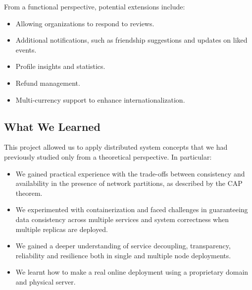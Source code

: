 From a functional perspective, potential extensions include:

\begin{itemize}
  \item Allowing organizations to respond to reviews.
  \item Additional notifications, such as friendship suggestions and updates on liked events.
  \item Profile insights and statistics.
  \item Refund management.
  \item Multi-currency support to enhance internationalization.
\end{itemize}

\subsection{What We Learned}

This project allowed us to apply distributed system concepts that we had previously studied only from a theoretical perspective. In particular:

\begin{itemize}
  \item We gained practical experience with the trade-offs between consistency and availability in the presence of network partitions, as described by the CAP theorem.

  \item We experimented with containerization and faced challenges in guaranteeing data consistency across multiple services and system correctness when multiple replicas are deployed.

  \item We gained a deeper understanding of service decoupling, transparency, reliability and resilience both in single and multiple node deployments.

  \item We learnt how to make a real online deployment using a proprietary domain and physical server.
\end{itemize}
